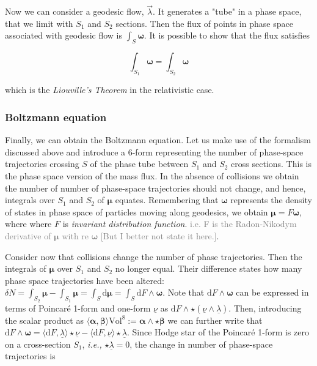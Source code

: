 \documentclass[11pt,a4paper,headinclude=true,DIV=14,BCOR=8mm,chapterprefix,listof=totoc,twoside,openright,abstracton]{scrbook}
\begin{document}
Now we can consider a geodesic flow, $\vec{\lambda}$. It generates a "tube" in a phase space, that we limit with $S_1$ and $S_2$ sections. Then the flux of points in phase space associated with geodesic flow is $\int_{S}\boldsymbol{\omega}$. It is possible to show that the flux satisfies

\begin{equation}
    \int_{S_1}\boldsymbol{\omega} = \int_{S_2}\boldsymbol{\omega}
    \label{eq:theory:liuville}
\end{equation}

which is the \textit{Liouville’s Theorem} in the relativistic case.

\subsubsection{Boltzmann equation}

Finally, we can obtain the Boltzmann equation. Let us make use of the formalism discussed above and introduce a 6-form representing the number of phase-space trajectories crossing $S$ of the phase tube between $S_1$ and $S_2$ cross sections. This is the phase space version of the mass flux. In the absence of collisions we obtain the number of number of phase-space trajectories should not change, and hence, integrals over $S_1$ and $S_2$ of $\boldsymbol{\mu}$ equates. Remembering that $\boldsymbol{\omega}$ represents the density of states in phase space of particles moving along geodesics, we obtain $\boldsymbol{\mu} = F\boldsymbol{\omega}$, where where $F$ is \textit{invariant distribution function}. \textcolor{gray}{i.e. F is the Radon-Nikodym derivative of $\boldsymbol{\mu}$ with re $\boldsymbol{\omega}$ [But I better not state it here.]}.

Consider now that collisions change the number of phase trajectories. Then the integrals of $\boldsymbol{\mu}$ over $S_1$ and $S_2$ no longer equal. Their difference states how many phase space trajectories have been altered: $\delta N = \int_{S_2} \boldsymbol{\mu} - \int_{S_1}\boldsymbol{\mu} = \int_S \text{d}\boldsymbol{\mu} = \int_S \text{d}F\wedge\boldsymbol{\omega}$. Note that $\text{d}F\wedge\boldsymbol{\omega}$ can be expressed in terms of Poincar\'{e} 1-form and one-form $\underline{\nu}$ as $\text{d}F\wedge\star (\underline{\nu}\wedge\underline{\lambda})$. Then, introducing the scalar product as $\langle\boldsymbol{\alpha},\boldsymbol{\beta}\rangle\text{Vol}^8 := \boldsymbol{\alpha}\wedge\star\boldsymbol{\beta}$ we can further write that $\text{d}F\wedge\boldsymbol{\omega} = \langle\text{d}F,\underline{\lambda}\rangle\star\underline{\nu} - \langle\text{d}F,\underline{\nu}\rangle\star\underline{\lambda}$. Since Hodge star of the Poincar\'{e} 1-form is zero on a cross-section $S_1$, \textit{i.e.,} $\star\underline{\lambda}=0$, the change in number of phase-space trajectories is 
\end{document}

